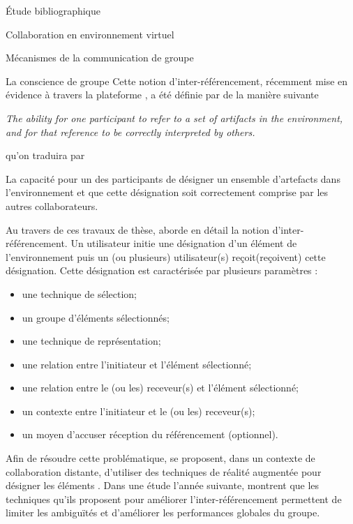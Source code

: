 \documentclass[myfrancais,ngerman,english,french]{mythesis}
\begin{document}
\begin{mychapter}{Étude bibliographique}
\begin{mysection}{Collaboration en environnement virtuel}
\begin{mysubsection}{Mécanismes de la communication de groupe}
\begin{mysubsubsection}{La conscience de groupe}
					Cette notion d'inter-référencement, récemment mise en évidence à travers la plateforme \myAMMPVis {}, a été définie par  de la manière suivante
					\begin{myquote}[english]
						\it The ability for one participant to refer to a set of artifacts in the environment, and for that reference to be correctly interpreted by others.
					\end{myquote}
					qu'on traduira par
					\begin{myquote}[french]
						La capacité pour un des participants de désigner un ensemble d'artefacts dans l'environnement et que cette désignation soit correctement comprise par les autres collaborateurs.
					\end{myquote}

					Au travers de ces travaux de thèse,  aborde en détail la notion d'inter-référencement.
					Un utilisateur initie une désignation d'un élément de l'environnement puis un (ou plusieurs) utilisateur(s) reçoit(reçoivent) cette désignation.
					Cette désignation est caractérisée par plusieurs paramètres :
					\begin{itemize}
						\item une technique de sélection;
						\item un groupe d'éléments sélectionnés;
						\item une technique de représentation;
						\item une relation entre l'initiateur et l'élément sélectionné;
						\item une relation entre le (ou les) receveur(s) et l'élément sélectionné;
						\item un contexte entre l'initiateur et le (ou les) receveur(s);
						\item un moyen d'accuser réception du référencement (optionnel).
					\end{itemize}

					Afin de résoudre cette problématique,  se proposent, dans un contexte de collaboration distante, d'utiliser des techniques de réalité augmentée pour désigner les éléments .
					Dans une étude l'année suivante,  montrent que les techniques qu'ils proposent pour améliorer l'inter-référencement permettent de limiter les ambiguïtés et d'améliorer les performances globales du groupe.


\end{mysubsubsection}
\end{mysubsection}
\end{mysection}
\end{mychapter}
\end{document}
